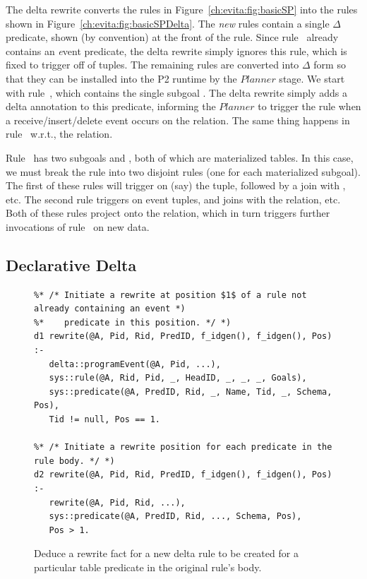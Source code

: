 The delta rewrite converts the rules in Figure~\ref{ch:evita:fig:basicSP} into
the rules shown in Figure~\ref{ch:evita:fig:basicSPDelta}.  The {\em new} rules
contain a single $\Delta$ predicate, shown (by convention) at the front of the
rule.  Since rule~ already contains an {\emph event} predicate, the
delta rewrite simply ignores this rule, which is fixed to trigger off of
 tuples.  The remaining rules are converted into $\Delta$ form
so that they can be installed into the P2 runtime by the $Planner$ stage.  We
start with rule~, which contains the single subgoal .  The
delta rewrite simply adds a delta annotation to this predicate, informing the
$Planner$ to trigger the rule when a receive/insert/delete event occurs on the
 relation.  The same thing happens in rule~ w.r.t., the
 relation.

Rule~ has two subgoals  and , both of which are
materialized tables.  In this case, we must break the rule into two disjoint
rules (one for each materialized subgoal).  The first of these rules will
trigger on (say) the  tuple, followed by a join with , etc.
The second rule triggers on  event tuples, and joins with the
 relation, etc.  Both of these rules project onto the 
relation, which in turn triggers further invocations of rule~ on new
 data.

\subsection{Declarative Delta}

\begin{figure}
\ssp
\centering
\begin{lstlisting}
%* /* Initiate a rewrite at position $1$ of a rule not already containing an event *)
%*    predicate in this position. */ *)
d1 rewrite(@A, Pid, Rid, PredID, f_idgen(), f_idgen(), Pos) :-
   delta::programEvent(@A, Pid, ...), 
   sys::rule(@A, Rid, Pid, _, HeadID, _, _, _, Goals),
   sys::predicate(@A, PredID, Rid, _, Name, Tid, _, Schema, Pos),
   Tid != null, Pos == 1.

%* /* Initiate a rewrite position for each predicate in the rule body. */ *)
d2 rewrite(@A, Pid, Rid, PredID, f_idgen(), f_idgen(), Pos) :-
   rewrite(@A, Pid, Rid, ...),
   sys::predicate(@A, PredID, Rid, ..., Schema, Pos),
   Pos > 1.
\end{lstlisting}
\caption{\label{ch:evita:fig:delta1}Deduce a rewrite fact for a new delta rule to be
created for a particular table predicate in the original rule's body.}
\end{figure}

